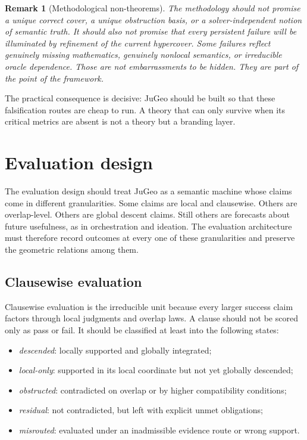 \documentclass[11pt]{report}
\newtheorem{remark}[definition]{Remark}
\begin{document}
\begin{remark}[Methodological non-theorems]
The methodology should not promise a unique correct cover, a unique obstruction basis, or a solver-independent notion of semantic truth. It should also not promise that every persistent failure will be illuminated by refinement of the current hypercover. Some failures reflect genuinely missing mathematics, genuinely nonlocal semantics, or irreducible oracle dependence. Those are not embarrassments to be hidden. They are part of the point of the framework.
\end{remark}

The practical consequence is decisive: JuGeo should be built so that these falsification routes are cheap to run. A theory that can only survive when its critical metrics are absent is not a theory but a branding layer.

\chapter{Evaluation design}
The evaluation design should treat JuGeo as a semantic machine whose claims come in different granularities. Some claims are local and clausewise. Others are overlap-level. Others are global descent claims. Still others are forecasts about future usefulness, as in orchestration and ideation. The evaluation architecture must therefore record outcomes at every one of these granularities and preserve the geometric relations among them.

\section{Clausewise evaluation}
Clausewise evaluation is the irreducible unit because every larger success claim factors through local judgments and overlap laws. A clause should not be scored only as pass or fail. It should be classified at least into the following states:
\begin{itemize}
\item \emph{descended}: locally supported and globally integrated;
\item \emph{local-only}: supported in its local coordinate but not yet globally descended;
\item \emph{obstructed}: contradicted on overlap or by higher compatibility conditions;
\item \emph{residual}: not contradicted, but left with explicit unmet obligations;
\item \emph{misrouted}: evaluated under an inadmissible evidence route or wrong support.
\end{itemize}
\end{document}

